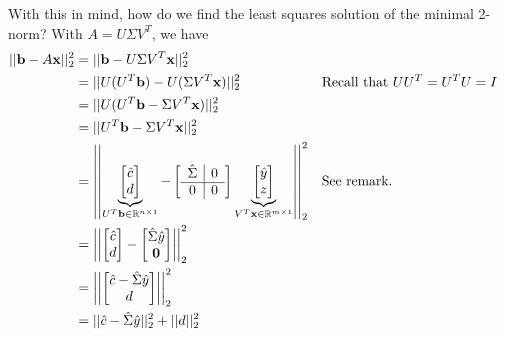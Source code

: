 \documentclass[letterpaper]{article}
\newcommand{\0}{\mathbf{0}}
\renewcommand{\b}{\mathbf{b}}
\newcommand{\x}{\mathbf{x}}
\begin{document}
With this in mind, how do we find the least squares solution of the minimal 2-norm? With $A = U\Sigma V^T$, we have 
\begin{equation*}
    \begin{aligned}
        ||\b - A\x||_2^2 &= ||\b - U\Sigma V^T \x||_2^2 \\ 
            &= ||U(U^T \b) - U(\Sigma V^T \x)||_2^2 && \text{Recall that } UU^T = U^T U = I \\ 
            &= ||U(U^T \b - \Sigma V^T \x)||_2^2 \\ 
            &= ||U^T \b - \Sigma V^T \x||_2^2 \\ 
            &= \left|\left| \underbrace{\begin{bmatrix}
                \hat{c} \\ 
                d
            \end{bmatrix}}_{U^T \b \in \R^{n \times 1}} - \left[
                \begin{array}{c|c}
                    \hat{\Sigma} & \makebox{0} \\ 
                    \hline 
                    \makebox{0} & \makebox{0}
                \end{array}
            \right] \underbrace{\begin{bmatrix}
                \hat{y} \\ z
            \end{bmatrix}}_{V^T \x \in \R^{m \times 1}} \right|\right|_2^2 && \text{See remark.} \\ 
            &= \left|\left| \begin{bmatrix}
                \hat{c} \\ 
                d
            \end{bmatrix} - \begin{bmatrix}
                \hat{\Sigma} \hat{y} \\ 
                \0
            \end{bmatrix} \right|\right|_2^2  \\ 
            &= \left|\left| \begin{bmatrix}
                \hat{c} - \hat{\Sigma} \hat{y} \\ 
                d
            \end{bmatrix} \right|\right|_2^2 \\ 
            &= ||\hat{c} - \hat{\Sigma} \hat{y}||_2^2 + ||d||_2^2
    \end{aligned}
\end{equation*}
\end{document}
